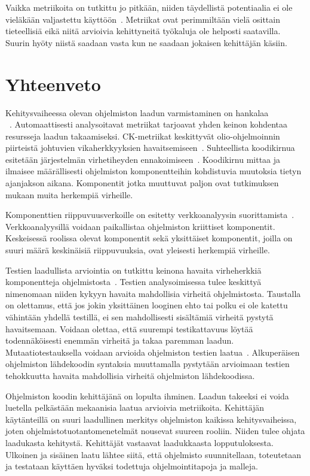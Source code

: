 \documentclass[finnish]{../tktltiki2}
\theoremstyle{definition}
\theoremstyle{remark}
\begin{document}
    Vaikka metriikoita on tutkittu jo pitkään, niiden täydellistä potentiaalia ei ole vieläkään valjastettu 
käyttöön~\cite{YH11}. Metriikat ovat perimmiltään vielä osittain tieteellisiä eikä niitä arvioivia kehittyneitä työkaluja 
ole helposti saatavilla. Suurin hyöty niistä saadaan vasta kun ne saadaan jokaisen kehittäjän käsiin.

\section{Yhteenveto}

Kehitysvaiheessa olevan ohjelmiston laadun varmistaminen on hankalaa\\~\cite{BBM96, NB05, NB07, ZN08, MNDT09}. 
Automaattisesti analysoitavat metriikat tarjoavat yhden keinon kohdentaa resursseja laadun takaamiseksi. CK-metriikat 
keskittyvät olio-ohjelmoinnin piirteistä johtuvien vikaherkkyyksien havaitsemiseen~\cite{CK94, BBM96}. Suhteellista 
koodikirnua esitetään järjestelmän virhetiheyden ennakoimiseen~\cite{NB05}. Koodikirnu mittaa ja ilmaisee määrällisesti 
ohjelmiston komponentteihin kohdistuvia muutoksia tietyn ajanjakson aikana. Komponentit jotka muuttuvat paljon ovat 
tutkimuksen mukaan muita herkempiä virheille.

    Komponenttien riippuvuusverkoille on esitetty verkkoanalyysin suorittamista~\cite{ZN08}. Verkkoanalyysillä voidaan 
paikallistaa ohjelmiston kriittiset komponentit. Keskeisessä roolissa olevat komponentit sekä yksittäiset komponentit, 
joilla on suuri määrä keskinäisiä riippuvuuksia, ovat yleisesti herkempiä virheille.

    Testien laadullista arviointia on tutkittu keinona havaita virheherkkiä komponentteja ohjelmistosta~\cite{MNDT09}. 
Testien analysoimisessa tulee keskittyä nimenomaan niiden kykyyn havaita mahdollisia virheitä ohjelmistosta. Taustalla 
on olettamus, että jos jokin yksittäinen looginen ehto tai polku ei ole katettu vähintään yhdellä testillä, ei sen 
mahdollisesti sisältämiä virheitä pystytä havaitsemaan. Voidaan olettaa, että suurempi testikattavuus löytää 
todennäköisesti enemmän virheitä ja takaa paremman laadun. Mutaatiotestauksella voidaan arvioida ohjelmiston 
testien laatua~\cite{YH11}. Alkuperäisen ohjelmiston lähdekoodin syntaksia muuttamalla pystytään arvioimaan testien 
tehokkuutta havaita mahdollisia virheitä ohjelmiston lähdekoodissa.

    Ohjelmiston koodin kehittäjänä on lopulta ihminen. Laadun takeeksi ei voida luetella pelkästään mekaanisia 
laatua arvioivia metriikoita. Kehittäjän käytänteillä on suuri laadullinen merkitys ohjelmiston kaikissa 
kehitysvaiheissa, joten ohjelmistotuotantomenetelmät nousevat suureen rooliin. Niiden tulee ohjata laadukasta kehitystä. 
Kehittäjät vastaavat laadukkaasta lopputuloksesta. Ulkoinen ja sisäinen laatu lähtee siitä, että ohjelmisto 
suunnitellaan, toteutetaan ja testataan käyttäen hyväksi todettuja ohjelmointitapoja ja malleja.
\end{document}

